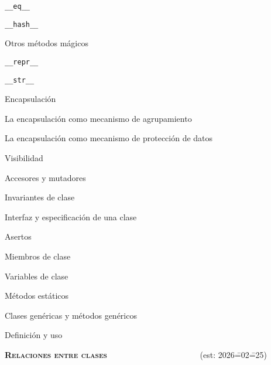 \begin{longenum}
\begin{longenum}
\begin{longenum}
            \begin{longenum}
                \item \texttt{\_\_eq\_\_}
                \item \texttt{\_\_hash\_\_}
            \end{longenum}
            \item Otros métodos mágicos
            \begin{longenum}
                \item \texttt{\_\_repr\_\_}
                \item \texttt{\_\_str\_\_}
            \end{longenum}
        \end{longenum}
        \item Encapsulación
        \begin{longenum}
            \item La encapsulación como mecanismo de agrupamiento
            \item La encapsulación como mecanismo de protección de datos
            \begin{longenum}
                \item Visibilidad
                \item Accesores y mutadores
                \item Invariantes de clase
                \item Interfaz y especificación de una clase
                \item Asertos
            \end{longenum}
        \end{longenum}
        \item Miembros de clase
        \begin{longenum}
            \item Variables de clase
            \item Métodos estáticos
        \end{longenum}
        \item Clases genéricas y métodos genéricos
        \begin{longenum}
            \item Definición y uso
        \end{longenum}
    \end{longenum}
    \item \textbf{\textsc{Relaciones entre clases}} \ \ \ \ \ \ \ \ \ \ \ \ \ \ \ \ \ \ \ \ \ \ (est: 2026\==02\==25)

\end{longenum}
